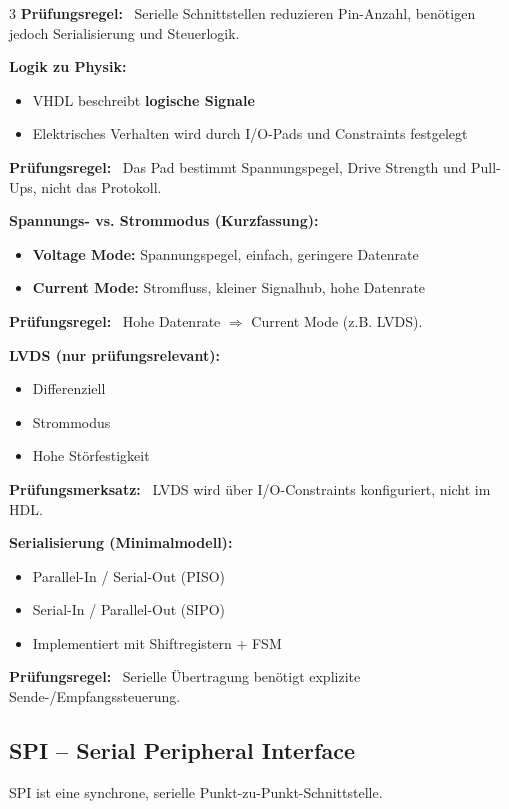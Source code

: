 \documentclass[10pt,a4paper]{article}
\newcommand{\prule}[1]{\textbf{\textcolor{examBlue}{Prüfungsregel:}}~#1}
\newcommand{\pmerke}[1]{\textbf{\textcolor{examBlue}{Prüfungsmerksatz:}}~#1}
\newcommand{\hilite}[1]{\colorbox{yellow!25}{#1}}
\begin{document}
\begin{multicols}{3}
\prule{%
Serielle Schnittstellen reduzieren Pin-Anzahl, benötigen jedoch \hilite{Serialisierung und Steuerlogik}.
}

\vspace{4pt}
\textbf{Logik zu Physik:}
\begin{itemize}
  \item VHDL beschreibt \textbf{logische Signale}
  \item Elektrisches Verhalten wird durch \hilite{I/O-Pads und Constraints} festgelegt
\end{itemize}

\prule{%
Das Pad bestimmt Spannungspegel, Drive Strength und Pull-Ups, \hilite{nicht das Protokoll}.
}

\vspace{4pt}
\textbf{Spannungs- vs. Strommodus (Kurzfassung):}
\begin{itemize}
  \item \textbf{Voltage Mode:} Spannungspegel, einfach, geringere Datenrate
  \item \textbf{Current Mode:} Stromfluss, kleiner Signalhub, hohe Datenrate
\end{itemize}

\prule{%
Hohe Datenrate $\Rightarrow$ \hilite{Current Mode} (z.B. LVDS).
}

\vspace{4pt}
\textbf{LVDS (nur prüfungsrelevant):}
\begin{itemize}
  \item Differenziell
  \item Strommodus
  \item Hohe Störfestigkeit
\end{itemize}

\pmerke{%
LVDS wird über \hilite{I/O-Constraints} konfiguriert, nicht im HDL.
}

\vspace{4pt}
\textbf{Serialisierung (Minimalmodell):}
\begin{itemize}
  \item Parallel-In / Serial-Out (PISO)
  \item Serial-In / Parallel-Out (SIPO)
  \item Implementiert mit \hilite{Shiftregistern + FSM}
\end{itemize}

\prule{%
Serielle Übertragung benötigt explizite \hilite{Sende-/Empfangssteuerung}.
}


\subsection{SPI – Serial Peripheral Interface}
SPI ist eine synchrone, serielle Punkt-zu-Punkt-Schnittstelle.


\end{multicols}
\end{document}
